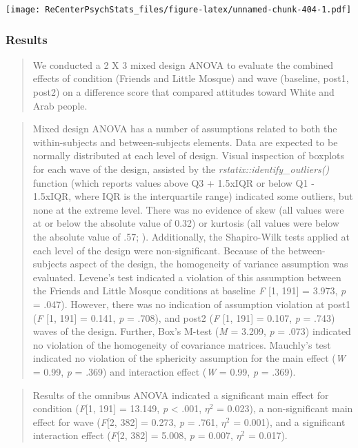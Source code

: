 \documentclass[
  11pt,
]{book}
\begin{document}
\texttt{[image: ReCenterPsychStats\_files/figure-latex/unnamed-chunk-404-1.pdf]}

\hypertarget{results}{%
\subsubsection{Results}\label{results}}

\begin{quote}
We conducted a 2 X 3 mixed design ANOVA to evaluate the combined effects of condition (Friends and Little Mosque) and wave (baseline, post1, post2) on a difference score that compared attitudes toward White and Arab people.
\end{quote}

\begin{quote}
Mixed design ANOVA has a number of assumptions related to both the within-subjects and between-subjects elements. Data are expected to be normally distributed at each level of design. Visual inspection of boxplots for each wave of the design, assisted by the \emph{rstatix::identify\_outliers()} function (which reports values above Q3 + 1.5xIQR or below Q1 - 1.5xIQR, where IQR is the interquartile range) indicated some outliers, but none at the extreme level. There was no evidence of skew (all values were at or below the absolute value of 0.32) or kurtosis (all values were below the absolute value of .57; \citep{kline_principles_2016}). Additionally, the Shapiro-Wilk tests applied at each level of the design were non-significant. Because of the between-subjects aspect of the design, the homogeneity of variance assumption was evaluated. Levene's test indicated a violation of this assumption between the Friends and Little Mosque conditions at baseline \emph{F} {[}1, 191{]} = 3.973, \emph{p} = .047). However, there was no indication of assumption violation at post1 (\emph{F} {[}1, 191{]} = 0.141, \emph{p} = .708), and post2 (\emph{F} {[}1, 191{]} = 0.107, \emph{p} = .743) waves of the design. Further, Box's M-test (\emph{M} = 3.209, \emph{p} = .073) indicated no violation of the homogeneity of covariance matrices. Mauchly's test indicated no violation of the sphericity assumption for the main effect (\emph{W} = 0.99, \emph{p} = .369) and interaction effect (\emph{W} = 0.99, \emph{p} = .369).
\end{quote}

\begin{quote}
Results of the omnibus ANOVA indicated a significant main effect for condition (\emph{F}{[}1, 191{]} = 13.149, \emph{p} \textless{} .001, \(\eta^{2}\) = 0.023), a non-significant main effect for wave (\emph{F}{[}2, 382{]} = 0.273, \emph{p} = .761, \(\eta^{2}\) = 0.001), and a significant interaction effect (\emph{F}{[}2, 382{]} = 5.008, \emph{p} = 0.007, \(\eta^{2}\) = 0.017).
\end{quote}
\end{document}

